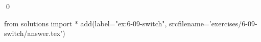 
\begin{ex}
  \label{ex:6-09-switch}
  
  \qed
\end{ex}
\begin{python0}
from solutions import *
add(label="ex:6-09-switch",
    srcfilename='exercises/6-09-switch/answer.tex')
\end{python0}
